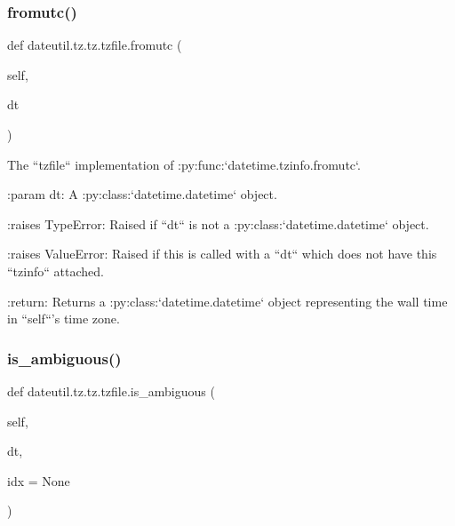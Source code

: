 \mbox{\label{classdateutil_1_1tz_1_1tz_1_1tzfile_a8c6d4edca5ed781e176a92ccca3cfb6b}} 
\subsubsection{\texorpdfstring{fromutc()}{fromutc()}}
{\footnotesize\ttfamily def dateutil.\+tz.\+tz.\+tzfile.\+fromutc (\begin{DoxyParamCaption}\item[{}]{self,  }\item[{}]{dt }\end{DoxyParamCaption})}

\begin{DoxyVerb}The ``tzfile`` implementation of :py:func:`datetime.tzinfo.fromutc`.

:param dt:
    A :py:class:`datetime.datetime` object.

:raises TypeError:
    Raised if ``dt`` is not a :py:class:`datetime.datetime` object.

:raises ValueError:
    Raised if this is called with a ``dt`` which does not have this
    ``tzinfo`` attached.

:return:
    Returns a :py:class:`datetime.datetime` object representing the
    wall time in ``self``'s time zone.
\end{DoxyVerb}
 \mbox{\label{classdateutil_1_1tz_1_1tz_1_1tzfile_a3b1d738119ae0027df8735c886c0d154}} 
\subsubsection{\texorpdfstring{is\+\_\+ambiguous()}{is\_ambiguous()}}
{\footnotesize\ttfamily def dateutil.\+tz.\+tz.\+tzfile.\+is\+\_\+ambiguous (\begin{DoxyParamCaption}\item[{}]{self,  }\item[{}]{dt,  }\item[{}]{idx = {\ttfamily None} }\end{DoxyParamCaption})}

